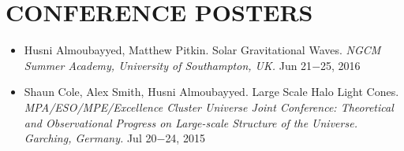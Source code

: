 \section{\textbf{\color{RoyalBlue}CONFERENCE POSTERS}}
\begin{itemize}

\item Husni Almoubayyed, Matthew Pitkin. Solar Gravitational Waves. {\sl NGCM Summer Academy, University of Southampton, UK.} \hfill Jun 21$-$25, 2016
\item Shaun Cole, Alex Smith, Husni Almoubayyed. Large Scale Halo Light Cones. {\sl MPA/ESO/MPE/Excellence Cluster Universe Joint Conference: Theoretical and Observational Progress on Large-scale Structure of the Universe. Garching, Germany.} \hfill  Jul 20$-$24, 2015
\end{itemize}